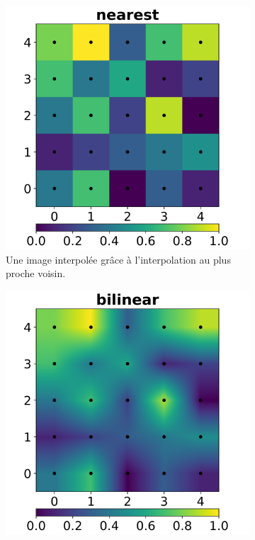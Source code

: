 {{{			\begin{figure}[h]
			    \centering
			    \begin{subfigure}{.32\linewidth}
			        \centering
			        \includegraphics[width=.9\linewidth]{img/image_interpolation_nearest.png}
			        \captionsetup{width=.9\linewidth}
			        \caption{Une image interpolée grâce à l'interpolation au plus proche voisin.}
			        \label{img:resampling:nearest}
			    \end{subfigure}
			    \begin{subfigure}{.32\linewidth}
			        \centering
			        \includegraphics[width=.9\linewidth]{img/image_interpolation_bilinear.png}

\end{subfigure}
\end{figure}}}}
